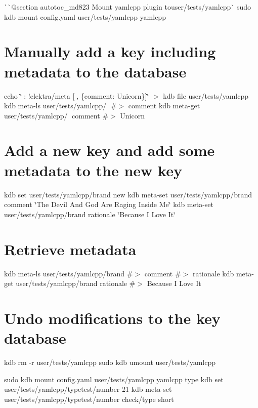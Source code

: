 \`{}\`{}{\ttfamily  @section autotoc\+\_\+md823 Mount yamlcpp plugin to}user/tests/yamlcpp\`{} sudo kdb mount config.\+yaml user/tests/yamlcpp yamlcpp\hypertarget{autotoc_md780_autotoc_md824}{}\section{Manually add a key including metadata to the database}\label{autotoc_md780_autotoc_md824}
echo \char`\"{}🔑\+: !elektra/meta \mbox{[}🦄, \{comment\+: Unicorn\}\mbox{]}\char`\"{} $>$ {\ttfamily kdb file user/tests/yamlcpp} kdb meta-\/ls user/tests/yamlcpp/🔑 \#$>$ comment kdb meta-\/get user/tests/yamlcpp/🔑 comment \#$>$ Unicorn\hypertarget{autotoc_md780_autotoc_md825}{}\section{Add a new key and add some metadata to the new key}\label{autotoc_md780_autotoc_md825}
kdb set user/tests/yamlcpp/brand new kdb meta-\/set user/tests/yamlcpp/brand comment \char`\"{}\+The Devil And God Are Raging Inside Me\char`\"{} kdb meta-\/set user/tests/yamlcpp/brand rationale \char`\"{}\+Because I Love It\char`\"{}\hypertarget{autotoc_md780_autotoc_md826}{}\section{Retrieve metadata}\label{autotoc_md780_autotoc_md826}
kdb meta-\/ls user/tests/yamlcpp/brand \#$>$ comment \#$>$ rationale kdb meta-\/get user/tests/yamlcpp/brand rationale \#$>$ Because I Love It\hypertarget{autotoc_md780_autotoc_md827}{}\section{Undo modifications to the key database}\label{autotoc_md780_autotoc_md827}
kdb rm -\/r user/tests/yamlcpp sudo kdb umount user/tests/yamlcpp 
\begin{DoxyCode}{0}
\end{DoxyCode}
 sudo kdb mount config.\+yaml user/tests/yamlcpp yamlcpp type kdb set user/tests/yamlcpp/typetest/number 21 kdb meta-\/set user/tests/yamlcpp/typetest/number check/type short

